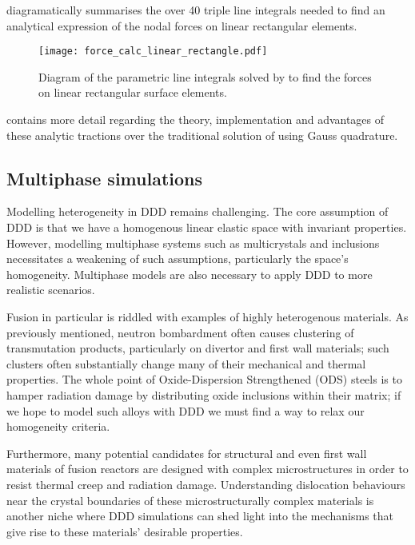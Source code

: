  diagramatically summarises the over 40 triple line integrals needed to find an analytical expression of the nodal forces on linear rectangular elements.
\begin{figure}
    \centering
    \texttt{[image: force\_calc\_linear\_rectangle.pdf]}
    \caption[Analytic tractions on linear rectangular surface elements.]{Diagram of the parametric line integrals solved by \citet{analytic_tractions} to find the forces on linear rectangular surface elements.}
    \label{f:force_lin_rectIntro}
\end{figure}
 contains more detail regarding the theory, implementation and advantages of these analytic tractions over the traditional solution of using Gauss quadrature.

\subsection{Multiphase simulations}
\label{ss:multiphase}

Modelling heterogeneity in DDD remains challenging. The core assumption of DDD is that we have a homogenous linear elastic space with invariant properties. However, modelling multiphase systems such as multicrystals and inclusions necessitates a weakening of such assumptions, particularly the space's homogeneity. Multiphase models are also necessary to apply DDD to more realistic scenarios.

Fusion in particular is riddled with examples of highly heterogenous materials. As previously mentioned, neutron bombardment often causes clustering of transmutation products, particularly on divertor and first wall materials; such clusters often substantially change many of their mechanical and thermal properties. The whole point of Oxide-Dispersion Strengthened (ODS) steels \cite{ddd_ods} is to hamper radiation damage by distributing oxide inclusions within their matrix; if we hope to model such alloys with DDD we must find a way to relax our homogeneity criteria.

Furthermore, many potential candidates for structural and even first wall materials of fusion reactors are designed with complex microstructures in order to resist thermal creep and radiation damage. Understanding dislocation behaviours near the crystal boundaries of these microstructurally complex materials is another niche where DDD simulations can shed light into the mechanisms that give rise to these materials' desirable properties.

